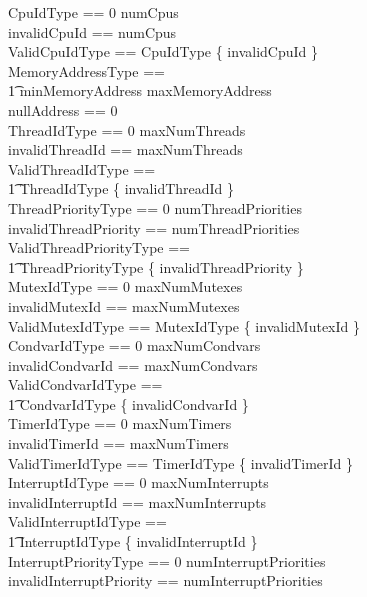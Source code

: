 \documentclass{AUJarticle}
\begin{document}
\begin{zed}
    CpuIdType == 0 \upto numCpus \\
    invalidCpuId == numCpus \\
    ValidCpuIdType == CpuIdType \setminus \{ invalidCpuId \} \\
    MemoryAddressType == \\
    \t1 minMemoryAddress \upto maxMemoryAddress \\
    nullAddress == 0 \\
    ThreadIdType == 0 \upto maxNumThreads \\
    invalidThreadId == maxNumThreads \\
    ValidThreadIdType == \\
    \t1 ThreadIdType \setminus \{ invalidThreadId \} \\
    ThreadPriorityType == 0 \upto numThreadPriorities \\
    invalidThreadPriority == numThreadPriorities \\
    ValidThreadPriorityType == \\
    \t1 ThreadPriorityType \setminus \{ invalidThreadPriority \} \\
    MutexIdType == 0 \upto maxNumMutexes \\
    invalidMutexId == maxNumMutexes \\
    ValidMutexIdType == MutexIdType \setminus \{ invalidMutexId \} \\
    CondvarIdType == 0 \upto maxNumCondvars \\
    invalidCondvarId == maxNumCondvars \\
    ValidCondvarIdType == \\
    \t1 CondvarIdType \setminus \{ invalidCondvarId \} \\
    TimerIdType == 0 \upto maxNumTimers \\
    invalidTimerId == maxNumTimers \\
    ValidTimerIdType == TimerIdType \setminus \{ invalidTimerId \} \\
    InterruptIdType == 0 \upto maxNumInterrupts \\
    invalidInterruptId == maxNumInterrupts \\
    ValidInterruptIdType == \\
    \t1 InterruptIdType \setminus \{ invalidInterruptId \} \\
    InterruptPriorityType == 0 \upto numInterruptPriorities \\
    invalidInterruptPriority == numInterruptPriorities \\

\end{zed}
\end{document}
